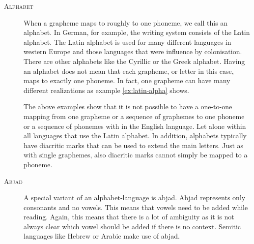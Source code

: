 \begin{description}
\item[\textsc{Alphabet}] When a grapheme maps to roughly to one phoneme, we call this an alphabet. In German, for example, the writing system consists of the Latin alphabet. The Latin alphabet is used for many different languages in western Europe and those languages that were influence by colonisation. There are other alphabets like the Cyrillic or the Greek alphabet. Having an alphabet does not mean that each grapheme, or letter in this case, maps to exactly one phoneme. In fact, one grapheme can have many different realizations as example \ref{ex:latin-alpha} shows.

The above examples show that it is not possible to have a one-to-one mapping from one grapheme or a sequence of graphemes to one phoneme or a sequence of phonemes with in the English language. Let alone within all languages that use the Latin alphabet. In addition, alphabets typically have diacritic marks that can be used to extend the main letters. Just as with single graphemes, also diacritic marks cannot simply be mapped to a phoneme.

\item[\textsc{Abjad}] A special variant of an alphabet-language is abjad. Abjad represents only consonants and no vowels. This means that vowels need to be added while reading. Again, this means that there is a lot of ambiguity as it is not always clear which vowel should be added if there is no context. Semitic languages like Hebrew or Arabic make use of abjad.



\end{description}
